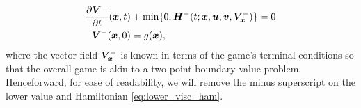 %
\begin{subequations}
	\begin{align}
		\frac{\partial \bm{V}^-}{\partial t}{(\bm{x}, t)} & + \min \{0, \bm{H}^- (t; \bm{x}, \bm{u}, \bm{v},\bm{V}^-_{\bm{x}}) \} = 0 \\
		\bm{V}^-(\bm{x},0) &= g(\bm{x}),
	\end{align}
	\label{eq:lower_hji_pde}
\end{subequations}
%
\noindent where the vector field $\bm{V}^-_{\bm{x}}$ is known in terms of the game's terminal conditions so that the overall game is akin to a two-point boundary-value problem. Henceforward, for ease of readability, we will remove the minus superscript on the lower value and Hamiltonian \eqref{eq:lower_visc_ham}. 


	
	
